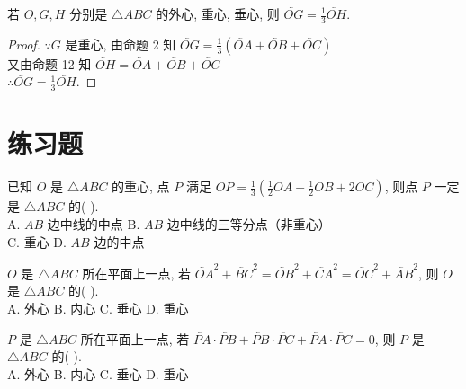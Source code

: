 
\begin{proposition}
    若 $O, G, H$ 分别是 $\triangle ABC$ 的外心, 重心, 垂心, 则 $\lvec{OG}=\frac{1}{3} \lvec{OH}$.
\end{proposition}

\begin{proof}
    $\because G$ 是重心, 由命题 2 知 $\lvec{OG}=\frac{1}{3}(\lvec{OA}+\lvec{OB}+\lvec{OC})$\\
    又由命题 12 知 $\lvec{OH}=\lvec{OA}+\lvec{OB}+\lvec{OC}$\\
    $\therefore \lvec{OG}=\frac{1}{3} \lvec{OH}$.
\end{proof}

\section{练习题}
\begin{exercise}
    已知 $O$ 是 $\triangle ABC$ 的重心, 点 $P$ 满足 $\lvec{OP}=\frac{1}{3}\left(\frac{1}{2} \lvec{OA}+\frac{1}{2} \lvec{OB}+2 \lvec{OC}\right)$, 则点 $P$ 一定是 $\triangle ABC$ 的( \quad ). \\
    A. $AB$ 边中线的中点 \qquad B. $AB$ 边中线的三等分点（非重心） \\
    C. 重心 \qquad D. $AB$ 边的中点
\end{exercise}

\begin{exercise}
    $O$ 是 $\triangle ABC$ 所在平面上一点, 若 $\lvec{OA}^{2}+\lvec{BC}^{2}=\lvec{OB}^{2}+\lvec{CA}^{2}=\lvec{OC}^{2}+\lvec{AB}^{2}$, 则 $O$ 是 $\triangle ABC$ 的( \quad ). \\
    A. 外心 \qquad B. 内心 \qquad C. 垂心 \qquad D. 重心
\end{exercise}

\begin{exercise}
    $P$ 是 $\triangle ABC$ 所在平面上一点, 若 $\lvec{PA} \cdot \lvec{PB}+\lvec{PB} \cdot \lvec{PC}+\lvec{PA} \cdot \lvec{PC}=0$, 则 $P$ 是 $\triangle ABC$ 的( \quad ). \\
    A. 外心 \qquad B. 内心 \qquad C. 垂心 \qquad D. 重心
\end{exercise}

